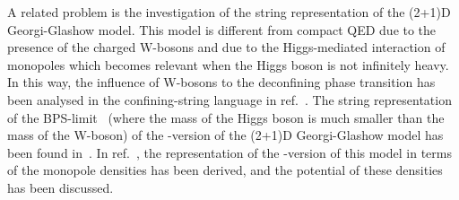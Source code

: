 \documentclass[a4paper,12pt]{article}
\begin{document}
A related problem is the investigation of the string representation of the (2+1)D Georgi-Glashow
model. This model is different from compact QED due to the presence of the charged W-bosons and due to the
Higgs-mediated interaction of monopoles which becomes relevant when the Higgs boson is not infinitely heavy.
In this way, the influence of W-bosons to the deconfining phase transition has been analysed in the confining-string language
in ref.~\cite{kogan}.
The string representation of
the BPS-limit~\cite{bps} (where the mass of the Higgs boson is much smaller than the mass of the
W-boson) of the \coordHE{}-version of the (2+1)D Georgi-Glashow model has been found in~\cite{nd}.
In ref.~\cite{mpla}, the representation of the \coordHE{}-version of this model in terms
of the monopole densities has been derived, and the potential of these densities has
been discussed.
\end{document}
